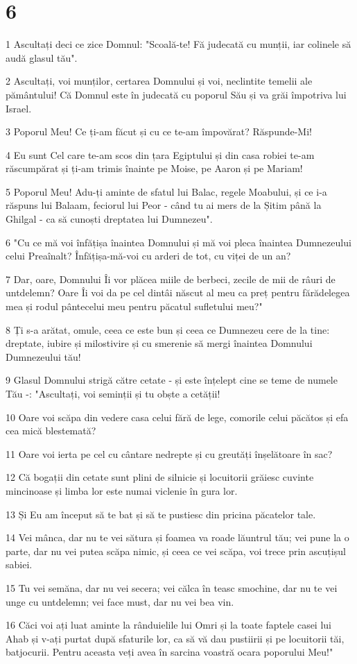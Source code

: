 \chapter{6}

\par 1 Ascultați deci ce zice Domnul: "Scoală-te! Fă judecată cu munții, iar colinele să audă glasul tău".
\par 2 Ascultați, voi munților, certarea Domnului și voi, neclintite temelii ale pământului! Că Domnul este în judecată cu poporul Său și va grăi împotriva lui Israel.
\par 3 Poporul Meu! Ce ți-am făcut și cu ce te-am împovărat? Răspunde-Mi!
\par 4 Eu sunt Cel care te-am scos din țara Egiptului și din casa robiei te-am răscumpărat și ți-am trimis înainte pe Moise, pe Aaron și pe Mariam!
\par 5 Poporul Meu! Adu-ți aminte de sfatul lui Balac, regele Moabului, și ce i-a răspuns lui Balaam, feciorul lui Peor - când tu ai mers de la Șitim până la Ghilgal - ca să cunoști dreptatea lui Dumnezeu".
\par 6 "Cu ce mă voi înfățișa înaintea Domnului și mă voi pleca înaintea Dumnezeului celui Preaînalt? Înfățișa-mă-voi cu arderi de tot, cu viței de un an?
\par 7 Dar, oare, Domnului Îi vor plăcea miile de berbeci, zecile de mii de râuri de untdelemn? Oare Îi voi da pe cel dintâi născut al meu ca preț pentru fărădelegea mea și rodul pântecelui meu pentru păcatul sufletului meu?"
\par 8 Ți s-a arătat, omule, ceea ce este bun și ceea ce Dumnezeu cere de la tine: dreptate, iubire și milostivire și cu smerenie să mergi înaintea Domnului Dumnezeului tău!
\par 9 Glasul Domnului strigă către cetate - și este înțelept cine se teme de numele Tău -: "Ascultați, voi seminții și tu obște a cetății!
\par 10 Oare voi scăpa din vedere casa celui fără de lege, comorile celui păcătos și efa cea mică blestemată?
\par 11 Oare voi ierta pe cel cu cântare nedrepte și cu greutăți înșelătoare în sac?
\par 12 Că bogații din cetate sunt plini de silnicie și locuitorii grăiesc cuvinte mincinoase și limba lor este numai viclenie în gura lor.
\par 13 Și Eu am început să te bat și să te pustiesc din pricina păcatelor tale.
\par 14 Vei mânca, dar nu te vei sătura și foamea va roade lăuntrul tău; vei pune la o parte, dar nu vei putea scăpa nimic, și ceea ce vei scăpa, voi trece prin ascuțișul sabiei.
\par 15 Tu vei semăna, dar nu vei secera; vei călca în teasc smochine, dar nu te vei unge cu untdelemn; vei face must, dar nu vei bea vin.
\par 16 Căci voi ați luat aminte la rânduielile lui Omri și la toate faptele casei lui Ahab și v-ați purtat după sfaturile lor, ca să vă dau pustiirii și pe locuitorii tăi, batjocurii. Pentru aceasta veți avea în sarcina voastră ocara poporului Meu!"

